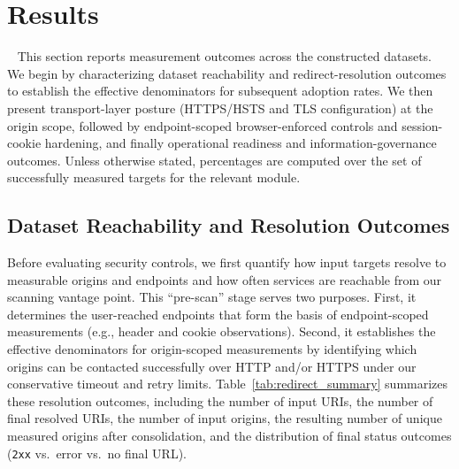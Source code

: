\documentclass[a4paper,fleqn]{cas-sc}
\begin{document}
\section{Results}~\label{sec:results}
    This section reports measurement outcomes across the constructed datasets. 
    We begin by characterizing dataset reachability and redirect-resolution outcomes to establish the effective denominators for subsequent adoption rates.
    We then present transport-layer posture (HTTPS/HSTS and TLS configuration) at the origin scope, followed by endpoint-scoped browser-enforced controls and session-cookie hardening, and finally operational readiness and information-governance outcomes. 
    Unless otherwise stated, percentages are computed over the set of successfully measured targets for the relevant module.

    \subsection{Dataset Reachability and Resolution Outcomes}\label{sec:reachability_resolution}
    Before evaluating security controls, we first quantify how input targets resolve to measurable origins and endpoints and how often services are reachable from our scanning vantage point. 
    This ``pre-scan'' stage serves two purposes. 
    First, it determines the user-reached endpoints that form the basis of endpoint-scoped measurements (e.g., header and cookie observations). 
    Second, it establishes the effective denominators for origin-scoped measurements by identifying which origins can be contacted successfully over HTTP and/or HTTPS under our conservative timeout and retry limits.
    Table~\ref{tab:redirect_summary} summarizes these resolution outcomes, including the number of input URIs, the number of final resolved URIs, the number of input origins, the resulting number of unique measured origins after consolidation, and the distribution of final status outcomes (\texttt{2xx} vs.\ error vs.\ no final URL).
\end{document}
